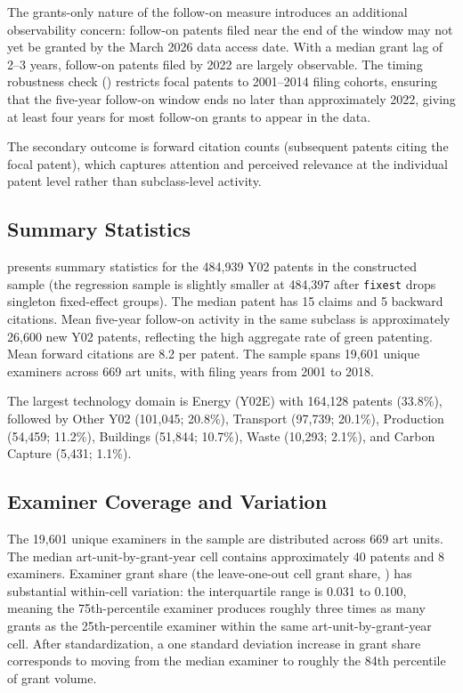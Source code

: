\documentclass[12pt]{article}
\begin{document}
The grants-only nature of the follow-on measure introduces an additional observability concern: follow-on patents filed near the end of the window may not yet be granted by the March 2026 data access date. With a median grant lag of 2--3 years, follow-on patents filed by 2022 are largely observable. The timing robustness check () restricts focal patents to 2001--2014 filing cohorts, ensuring that the five-year follow-on window ends no later than approximately 2022, giving at least four years for most follow-on grants to appear in the data.

The secondary outcome is forward citation counts (subsequent patents citing the focal patent), which captures attention and perceived relevance at the individual patent level rather than subclass-level activity.

\subsection{Summary Statistics}



 presents summary statistics for the 484,939 Y02 patents in the constructed sample (the regression sample is slightly smaller at 484,397 after \texttt{fixest} drops singleton fixed-effect groups). The median patent has 15 claims and 5 backward citations. Mean five-year follow-on activity in the same subclass is approximately 26,600 new Y02 patents, reflecting the high aggregate rate of green patenting. Mean forward citations are 8.2 per patent. The sample spans 19,601 unique examiners across 669 art units, with filing years from 2001 to 2018.

The largest technology domain is Energy (Y02E) with 164,128 patents (33.8\%), followed by Other Y02 (101,045; 20.8\%), Transport (97,739; 20.1\%), Production (54,459; 11.2\%), Buildings (51,844; 10.7\%), Waste (10,293; 2.1\%), and Carbon Capture (5,431; 1.1\%).

\subsection{Examiner Coverage and Variation}

The 19,601 unique examiners in the sample are distributed across 669 art units. The median art-unit-by-grant-year cell contains approximately 40 patents and 8 examiners. Examiner grant share (the leave-one-out cell grant share, ) has substantial within-cell variation: the interquartile range is 0.031 to 0.100, meaning the 75th-percentile examiner produces roughly three times as many grants as the 25th-percentile examiner within the same art-unit-by-grant-year cell. After standardization, a one standard deviation increase in grant share corresponds to moving from the median examiner to roughly the 84th percentile of grant volume.
\end{document}
